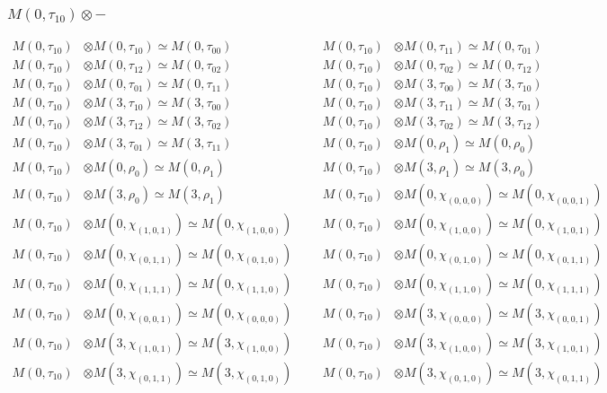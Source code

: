 \subsubsection{$ M(0,\tau_{10})\otimes -$}
\begin{align*}
M(0,\tau_{10}) &\otimes M(0,\tau_{10}) \simeq M(0,\tau_{00}) &&& M(0,\tau_{10}) &\otimes M(0,\tau_{11}) \simeq M(0,\tau_{01})\\
M(0,\tau_{10}) &\otimes M(0,\tau_{12}) \simeq M(0,\tau_{02}) &&& M(0,\tau_{10}) &\otimes M(0,\tau_{02}) \simeq M(0,\tau_{12})\\
M(0,\tau_{10}) &\otimes M(0,\tau_{01}) \simeq M(0,\tau_{11}) &&& M(0,\tau_{10}) &\otimes M(3,\tau_{00}) \simeq M(3,\tau_{10})\\
M(0,\tau_{10}) &\otimes M(3,\tau_{10}) \simeq M(3,\tau_{00}) &&& M(0,\tau_{10}) &\otimes M(3,\tau_{11}) \simeq M(3,\tau_{01})\\
M(0,\tau_{10}) &\otimes M(3,\tau_{12}) \simeq M(3,\tau_{02}) &&& M(0,\tau_{10}) &\otimes M(3,\tau_{02}) \simeq M(3,\tau_{12})\\
M(0,\tau_{10}) &\otimes M(3,\tau_{01}) \simeq M(3,\tau_{11}) &&& M(0,\tau_{10}) &\otimes M(0,\rho_{1}) \simeq M(0,\rho_{0})\\
M(0,\tau_{10}) &\otimes M(0,\rho_{0}) \simeq M(0,\rho_{1}) &&& M(0,\tau_{10}) &\otimes M(3,\rho_{1}) \simeq M(3,\rho_{0})\\
M(0,\tau_{10}) &\otimes M(3,\rho_{0}) \simeq M(3,\rho_{1}) &&& M(0,\tau_{10}) &\otimes M(0,\chi_{(0,0,0)}) \simeq M(0,\chi_{(0,0,1)})\\
M(0,\tau_{10}) &\otimes M(0,\chi_{(1,0,1)}) \simeq M(0,\chi_{(1,0,0)}) &&& M(0,\tau_{10}) &\otimes M(0,\chi_{(1,0,0)}) \simeq M(0,\chi_{(1,0,1)})\\
M(0,\tau_{10}) &\otimes M(0,\chi_{(0,1,1)}) \simeq M(0,\chi_{(0,1,0)}) &&& M(0,\tau_{10}) &\otimes M(0,\chi_{(0,1,0)}) \simeq M(0,\chi_{(0,1,1)})\\
M(0,\tau_{10}) &\otimes M(0,\chi_{(1,1,1)}) \simeq M(0,\chi_{(1,1,0)}) &&& M(0,\tau_{10}) &\otimes M(0,\chi_{(1,1,0)}) \simeq M(0,\chi_{(1,1,1)})\\
M(0,\tau_{10}) &\otimes M(0,\chi_{(0,0,1)}) \simeq M(0,\chi_{(0,0,0)}) &&& M(0,\tau_{10}) &\otimes M(3,\chi_{(0,0,0)}) \simeq M(3,\chi_{(0,0,1)})\\
M(0,\tau_{10}) &\otimes M(3,\chi_{(1,0,1)}) \simeq M(3,\chi_{(1,0,0)}) &&& M(0,\tau_{10}) &\otimes M(3,\chi_{(1,0,0)}) \simeq M(3,\chi_{(1,0,1)})\\
M(0,\tau_{10}) &\otimes M(3,\chi_{(0,1,1)}) \simeq M(3,\chi_{(0,1,0)}) &&& M(0,\tau_{10}) &\otimes M(3,\chi_{(0,1,0)}) \simeq M(3,\chi_{(0,1,1)})\\

\end{align*}
